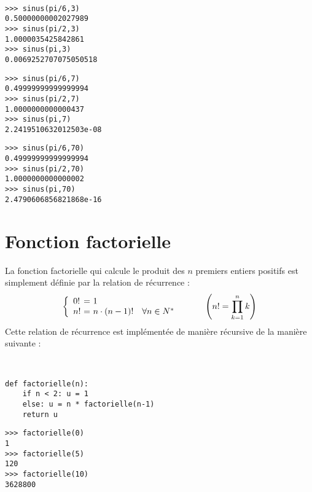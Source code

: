 \mbox{}\ \ \begin{py}{4cm}
\begin{verbatim}
>>> sinus(pi/6,3)
0.50000000002027989
>>> sinus(pi/2,3)
1.0000035425842861
>>> sinus(pi,3)
0.0069252707075050518
\end{verbatim}
\end{py}
\hfill
\begin{py}{4cm}
\begin{verbatim}
>>> sinus(pi/6,7)
0.49999999999999994
>>> sinus(pi/2,7)
1.0000000000000437
>>> sinus(pi,7)
2.2419510632012503e-08
\end{verbatim}
\end{py}
\hfill
\begin{py}{4cm}
\begin{verbatim}
>>> sinus(pi/6,70)
0.49999999999999994
>>> sinus(pi/2,70)
1.0000000000000002
>>> sinus(pi,70)
2.4790606856821868e-16
\end{verbatim}
\end{py}
\vspace*{2mm}

\section*{Fonction factorielle}

La fonction factorielle qui calcule le produit des 
$n$ premiers entiers positifs  
est simplement définie par la relation de
récurrence :
$$\left\{\begin{array}{l@{\ =\ }ll}
0! & 1 & \\
n! & n\cdot (n-1)! & \forall n \in N^*
\end{array}\right.\hspace*{1cm}
\left(n! = \prod_{k=1}^n k\right)$$
Cette relation de récurrence est implémentée de manière récursive
de la manière suivante :

\mbox{}\ \ \begin{py}{8cm}
\begin{verbatim}
def factorielle(n):
    if n < 2: u = 1
    else: u = n * factorielle(n-1)
    return u
\end{verbatim}
\end{py}
\hfill
\begin{py}{5cm}
\begin{verbatim}
>>> factorielle(0)
1
>>> factorielle(5)
120
>>> factorielle(10)
3628800
\end{verbatim}
\end{py}
\vspace*{2mm}

